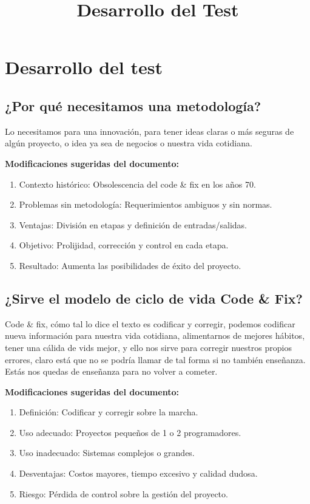 \documentclass{article}
\title{Desarrollo del Test}
\author{}
\date{}
\begin{document}
\maketitle

\section{Desarrollo del test}

\subsection{¿Por qué necesitamos una metodología?}

Lo necesitamos para una innovación, para tener ideas claras o más seguras de algún proyecto, o idea ya sea de negocios o nuestra vida cotidiana.

\begin{framed}
\noindent\textbf{Modificaciones sugeridas del documento:}
\begin{enumerate}
    \item Contexto histórico: Obsolescencia del code \& fix en los años 70.
    \item Problemas sin metodología: Requerimientos ambiguos y sin normas.
    \item Ventajas: División en etapas y definición de entradas/salidas.
    \item Objetivo: Prolijidad, corrección y control en cada etapa.
    \item Resultado: Aumenta las posibilidades de éxito del proyecto.
\end{enumerate}
\end{framed}

\subsection{¿Sirve el modelo de ciclo de vida Code \& Fix?}

Code \& fix, cómo tal lo dice el texto es codificar y corregir, podemos codificar nueva información para nuestra vida cotidiana, alimentarnos de mejores hábitos, tener una cálida de vids mejor, y ello nos sirve para corregir nuestros propios errores, claro está que no se podría llamar de tal forma si no también enseñanza. Estás nos quedas de enseñanza para no volver a cometer.

\begin{framed}
\noindent\textbf{Modificaciones sugeridas del documento:}
\begin{enumerate}
    \item Definición: Codificar y corregir sobre la marcha.
    \item Uso adecuado: Proyectos pequeños de 1 o 2 programadores.
    \item Uso inadecuado: Sistemas complejos o grandes.
    \item Desventajas: Costos mayores, tiempo excesivo y calidad dudosa.
    \item Riesgo: Pérdida de control sobre la gestión del proyecto.
\end{enumerate}
\end{framed}
\end{document}
